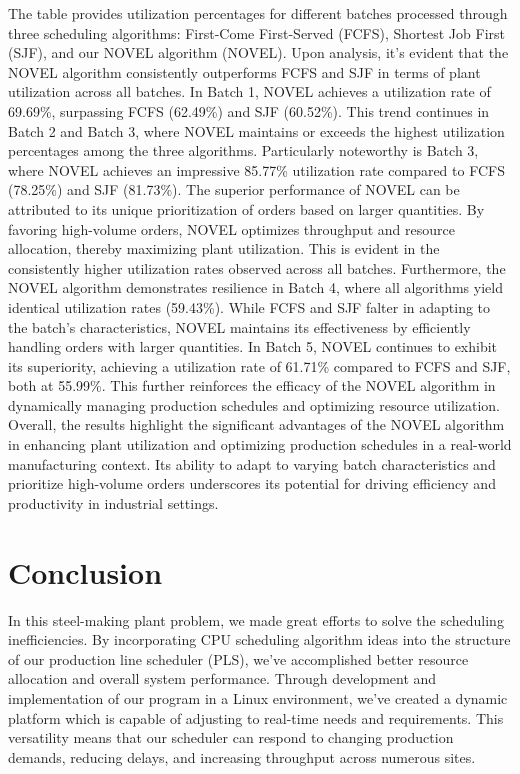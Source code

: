 \documentclass[conference]{IEEEtran}
\begin{document}
The table provides utilization percentages for different batches processed through three scheduling algorithms: First-Come First-Served (FCFS), Shortest Job First (SJF), and our NOVEL algorithm (NOVEL). Upon analysis, it's evident that the NOVEL algorithm consistently outperforms FCFS and SJF in terms of plant utilization across all batches.
In Batch 1, NOVEL achieves a utilization rate of 69.69\%, surpassing FCFS (62.49\%) and SJF (60.52\%). This trend continues in Batch 2 and Batch 3, where NOVEL maintains or exceeds the highest utilization percentages among the three algorithms. Particularly noteworthy is Batch 3, where NOVEL achieves an impressive 85.77\% utilization rate compared to FCFS (78.25\%) and SJF (81.73\%).
The superior performance of NOVEL can be attributed to its unique prioritization of orders based on larger quantities. By favoring high-volume orders, NOVEL optimizes throughput and resource allocation, thereby maximizing plant utilization. This is evident in the consistently higher utilization rates observed across all batches.
Furthermore, the NOVEL algorithm demonstrates resilience in Batch 4, where all algorithms yield identical utilization rates (59.43\%). While FCFS and SJF falter in adapting to the batch's characteristics, NOVEL maintains its effectiveness by efficiently handling orders with larger quantities.
In Batch 5, NOVEL continues to exhibit its superiority, achieving a utilization rate of 61.71\% compared to FCFS and SJF, both at 55.99\%. This further reinforces the efficacy of the NOVEL algorithm in dynamically managing production schedules and optimizing resource utilization.
Overall, the results highlight the significant advantages of the NOVEL algorithm in enhancing plant utilization and optimizing production schedules in a real-world manufacturing context. Its ability to adapt to varying batch characteristics and prioritize high-volume orders underscores its potential for driving efficiency and productivity in industrial settings.


\section{\textbf{Conclusion}}
In this steel-making plant problem, we made great efforts to solve the scheduling inefficiencies. By incorporating CPU scheduling algorithm ideas into the structure of our production line scheduler (PLS), we've accomplished better resource allocation and overall system performance. Through development and implementation of our program in a Linux environment, we've created a dynamic platform which is capable of adjusting to real-time needs and requirements. This versatility means that our scheduler can respond to changing production demands, reducing delays, and increasing throughput across numerous sites. 
\end{document}
